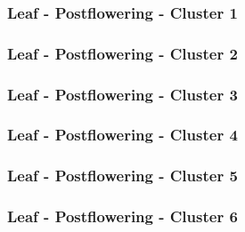 \subsubsection{Leaf - Postflowering - Cluster 1}

\vspace{1em}



\clearpage

\subsubsection{Leaf - Postflowering - Cluster 2}

\vspace{1em}



\clearpage

\subsubsection{Leaf - Postflowering - Cluster 3}

\vspace{1em}



\clearpage

\subsubsection{Leaf - Postflowering - Cluster 4}

\vspace{1em}



\clearpage

\subsubsection{Leaf - Postflowering - Cluster 5}

\vspace{1em}



\clearpage

\subsubsection{Leaf - Postflowering - Cluster 6}

